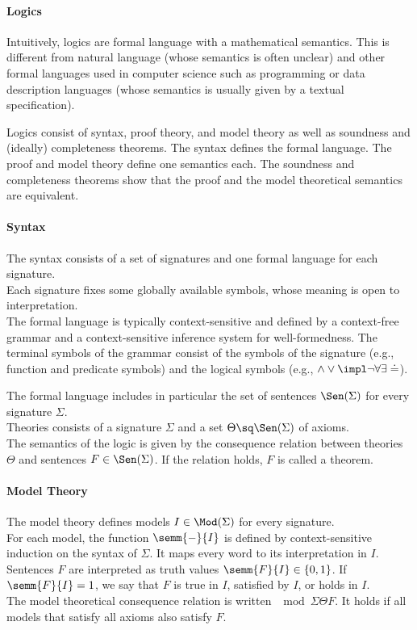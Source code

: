 \paragraph{Logics}
Intuitively, logics are formal language with a mathematical semantics.
This is different from natural language (whose semantics is often unclear) and other formal languages used in computer science such as programming or data description languages (whose semantics is usually given by a textual specification).
\medskip

Logics consist of syntax, proof theory, and model theory as well as soundness and (ideally) completeness theorems.
The syntax defines the formal language.
The proof and model theory define one semantics each.
The soundness and completeness theorems show that the proof and the model theoretical semantics are equivalent.

\paragraph{Syntax}
The syntax consists of a set of signatures and one formal language for each signature.\\
Each signature fixes some globally available symbols, whose meaning is open to interpretation.\\
The formal language is typically context-sensitive and defined by a context-free grammar and a context-sensitive inference system for well-formedness.
The terminal symbols of the grammar consist of the symbols of the signature (e.g., function and predicate symbols) and the logical symbols (e.g., $\wedge\vee\impl\neg\forall\exists\doteq$).
\medskip

The formal language includes in particular the set of sentences $\Sen(\Sigma)$ for every signature $\Sigma$.\\
Theories consists of a signature $\Sigma$ and a set $\Theta\sq\Sen(\Sigma)$ of axioms.\\
The semantics of the logic is given by the consequence relation between theories $\Theta$ and sentences $F\in\Sen(\Sigma)$.
If the relation holds, $F$ is called a theorem.

\paragraph{Model Theory}
The model theory defines models $I\in\Mod(\Sigma)$ for every signature.\\
For each model, the function $\semm{-}{I}$ is defined by context-sensitive induction on the syntax of $\Sigma$.
It maps every word to its interpretation in $I$.\\
Sentences $F$ are interpreted as truth values $\semm{F}{I}\in\{0,1\}$. If $\semm{F}{I}=1$, we say that $F$ is true in $I$, satisfied by $I$, or holds in $I$.\\
The model theoretical consequence relation is written $\mod{\Sigma}{\Theta}{F}$. It holds if all models that satisfy all axioms also satisfy $F$.
\medskip

